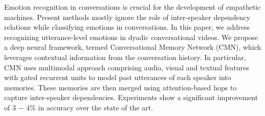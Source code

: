 Emotion recognition in conversations is crucial for the development of empathetic machines. Present methods mostly ignore the role of inter-speaker dependency relations while classifying emotions in conversations. In this paper, we address recognizing utterance-level emotions in dyadic conversational videos. We propose a deep neural framework, termed Conversational Memory Network (CMN), which leverages contextual information from the conversation history. In particular, CMN uses multimodal approach comprising audio, visual and textual features with gated recurrent units to model past utterances of each speaker into memories. These memories are then merged using attention-based hops to capture inter-speaker dependencies. Experiments show a significant improvement of 3 − 4\% in accuracy over the state of the art.
